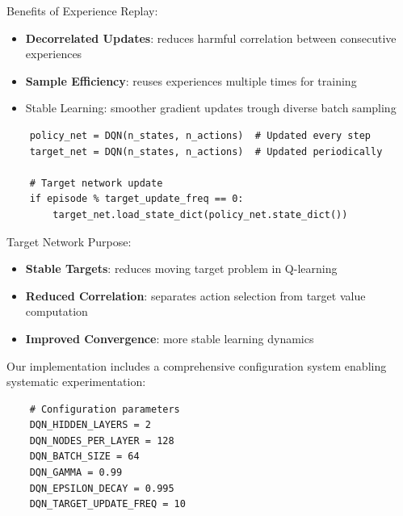 \documentclass[a4paper,12pt]{article}
\begin{document}
Benefits of Experience Replay:
\begin{itemize}
    \item \textbf{Decorrelated Updates}: reduces harmful correlation between consecutive experiences 
    \item \textbf{Sample Efficiency}: reuses experiences multiple times for training
    \item Stable Learning: smoother gradient updates trough diverse batch sampling
\end{itemize}
\begin{lstlisting}
    policy_net = DQN(n_states, n_actions)  # Updated every step
    target_net = DQN(n_states, n_actions)  # Updated periodically
    
    # Target network update
    if episode % target_update_freq == 0:
        target_net.load_state_dict(policy_net.state_dict())
\end{lstlisting}
Target Network Purpose:
\begin{itemize}
    \item \textbf{Stable Targets}: reduces moving target problem in Q-learning
    \item \textbf{Reduced Correlation}: separates action selection from target value computation
    \item \textbf{Improved Convergence}: more stable learning dynamics
\end{itemize}
Our implementation includes a comprehensive configuration system enabling systematic experimentation:
\begin{lstlisting}
    # Configuration parameters
    DQN_HIDDEN_LAYERS = 2
    DQN_NODES_PER_LAYER = 128
    DQN_BATCH_SIZE = 64
    DQN_GAMMA = 0.99
    DQN_EPSILON_DECAY = 0.995
    DQN_TARGET_UPDATE_FREQ = 10
\end{lstlisting}
\end{document}
